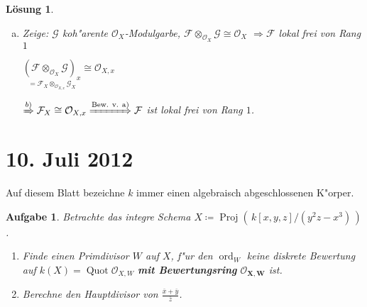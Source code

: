\documentclass[paper = A4, fontsize=12pt, numbers=noendperiod, chapterprefix=true]{scrbook}
\theoremstyle{break}
\newtheorem{Aufg}{Aufgabe}
\newtheorem{Loes}{L\"osung}
\theoremstyle{nonumberbreak}
\theoremstyle{nonumberplain}
\newcommand{\quot}[1]{\textrm{\glqq}{#1}\textrm{\grqq}}
\DeclareMathOperator{\Proj}{Proj}
\DeclareMathOperator{\Quot}{Quot}
\DeclareMathOperator{\ord}{ord}
\newcommand{\calF}{\mathcal{F}}
\newcommand{\calG}{\mathcal{G}}
\newcommand{\calO}{\mathcal{O}}
\newcommand{\FakRaum}[2]{
	\raisebox{0.7ex}{\ensuremath{#1}}
	\ensuremath{\mkern-3mu}\big/\ensuremath{\mkern-3mu}
	\raisebox{-0.6ex}{\ensuremath{#2}}}
\renewcommand{\OE}{O\!\!E~}
\begin{document}
\begin{Loes}
\begin{enumerate}[a)]
	$(ab \otimes m) \otimes (1 \otimes n) = (a \otimes m) \otimes (b \otimes n) \Rightarrow \varphi$ surjektiv $\Rightarrow \dim_k (k \otimes_A M) \otimes_k (k \otimes_A N) \le 1$
	
	\emph{Annahme:} \quot{$=0$}
	
	$\Rightarrow k \otimes_A M = 0$ oder $k \otimes_A N = 0$
	
	\OE $k \otimes_A M = 0$ \textcolor{gray}{($k \otimes_A M = \FakRaum{A}{m} \otimes_A M = \FakRaum{M}{mM}$)}
	
	$\Rightarrow M = mM + 0 \xRightarrow{\text{Nakayama}} M = 0$\\
	$\Rightarrow A = M \otimes_A N = 0 \lightning$
	
	$\Rightarrow \dim_k (k \otimes_A M) = 0$
	
	$\FakRaum{M}{mM} \cong \FakRaum{A}{m} \xRightarrow{\text{Nakayama}} M \cong A$, $N \cong A$ analog
	
	$M = mM + (X)$ $A$-Modul
\item
	\emph{Zeige:} $\calG$ koh"arente $\calO_X$-Modulgarbe, $\calF \otimes_{\calO_X} \calG \cong \calO_X$ $\Rightarrow \calF$ lokal frei von Rang $1$
	
	$\underset{=\calF_X \otimes_{\calO_{X,x}} \calG_X}{(\calF \otimes_{\calO_X} \calG)_x} \cong \calO_{X,x}$
	
	$\xRightarrow{b)} \calF_X \cong \calO_{X,x} \xRightarrow{\text{Bew. v. a)}} \calF$ ist lokal frei von Rang $1$.
\end{enumerate}\end{Loes}


\newpage
\section{10. Juli 2012}
\setcounter{Aufg}{0}
\setcounter{Loes}{0}

Auf diesem Blatt bezeichne $k$ immer einen algebraisch abgeschlossenen K"orper.

\begin{Aufg}
Betrachte das integre Schema $X \coloneqq \Proj( \, k[x,y,z]/(y^2z-x^3)\,)$.
\begin{enumerate}%
 \item Finde einen Primdivisor $W$ auf $X$, f"ur den $\ord_W$ keine diskrete Bewertung auf $k(X) = \Quot \calO_{X,W}$ \textbf{mit Bewertungsring} $\mathbf{\calO_{X,W}}$ ist.
 \item Berechne den Hauptdivisor von $\frac{\overline x + \overline y}{\overline z}$.
\end{enumerate}
\end{Aufg}
\end{document}
